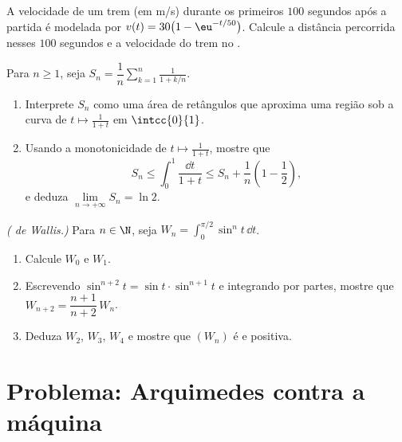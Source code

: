 \begin{exercise}[$\star\star$]\label{exo:g12:integ:7}
A velocidade de um trem (em m/s) durante os primeiros $100$ segundos após
a partida é modelada por $v(t) = 30\bigl(1 - \eu^{-t/50}\bigr)$. Calcule a
distância percorrida nesses $100$ segundos e a velocidade  do trem no
.
\end{exercise}

\begin{exercise}[$\star\star\star$]\label{exo:g12:integ:8}
Para $n \geq 1$, seja
$S_n = \dfrac1n \displaystyle\sum_{k=1}^{n} \frac{1}{1 + k/n}$.
\begin{enumerate}
  \item Interprete $S_n$ como uma área de retângulos que aproxima uma
        região sob a curva de $t \mapsto \frac{1}{1+t}$ em
        $\intcc{0}{1}$.
  \item Usando a monotonicidade de $t \mapsto \frac{1}{1+t}$, mostre que
        \[
        S_n \leq \int_0^1 \frac{\dd t}{1+t} \leq S_n + \frac1n\left(1 - \frac12\right),
        \]
        e deduza $\lim\limits_{n\to+\infty} S_n = \ln 2$.
\end{enumerate}
\end{exercise}

\begin{exercise}[$\star\star\star$]\label{exo:g12:integ:9}
\emph{( de Wallis.)} Para $n \in \N$, seja
$W_n = \displaystyle\int_0^{\pi/2} \sin^n t\,\dd t$.
\begin{enumerate}
  \item Calcule $W_0$ e $W_1$.
  \item Escrevendo $\sin^{n+2}t = \sin t \cdot \sin^{n+1} t$ e integrando
        por partes, mostre que $W_{n+2} = \dfrac{n+1}{n+2}\,W_n$.
  \item Deduza $W_2$, $W_3$, $W_4$ e mostre que $(W_n)$ é  e
        positiva.
\end{enumerate}
\end{exercise}

\section{Problema: Arquimedes contra a máquina}

